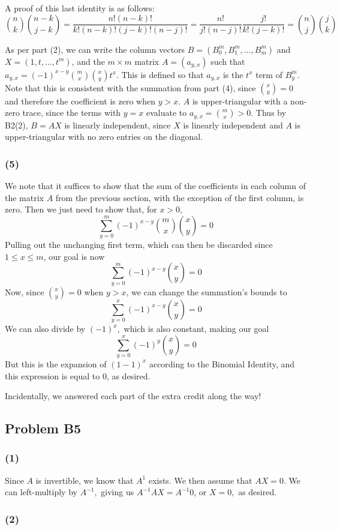 \documentclass{article}
\begin{document}
A proof of this last identity is as follows:
\[\binom{n}{k}\binom{n-k}{j-k} = \frac{n!(n-k)!}{k!(n-k)!(j-k)!(n-j)!}
=\frac{n!}{j!(n-j)!}\frac{j!}{k!(j-k)!} = \binom{n}{j}\binom{j}{k}\]

\medskip
As per part (2), we can write the column vectors
$B = \displaystyle{(B_0^m, B_1^m,\dots,B_m^m)}$ and $X = (1,t,\dots,t^m)$,
and the $m\times m$ matrix
$A = (a_{y,x})$ such that $a_{y,x} = (-1)^{x - y} \binom{m}{x}\binom{x}{y}t^x$.
This is defined so that $a_{y,x}$ is the $t^x$ term of $B^m_y$.
Note that this is consistent with the summation from part (4), since 
$\binom{x}{y} = 0$ and therefore the coefficient is zero when $y > x$. 
$A$ is upper-triangular with a non-zero trace, since the terms with $y=x$
evaluate to $a_{y,x} = \binom{m}{x} > 0$.
Thus by B2(2), $B = AX$ is linearly independent, since $X$ is linearly
independent and $A$ is upper-triangular with no zero entries on the diagonal.

\subsubsection{(5)}
We note that it suffices to show that the sum of the coefficients in each column
of the matrix $A$ from the previous section, with the exception of the first
column, is zero.
Then we just need to show that, for $x > 0,$
\[\sum_{y=0}^m (-1)^{x-y} \binom{m}{x}\binom{x}{y} = 0\]
Pulling out the unchanging first term, which can then be discarded since
$1 \leq x \leq m$, our goal is now
\[\sum_{y=0}^m (-1)^{x-y}\binom{x}{y} = 0\]
Now, since $\binom{x}{y} = 0$ when $y > x$, we can change the summation's bounds
to
\[\sum_{y=0}^x (-1)^{x-y}\binom{x}{y} = 0\]
We can also divide by $(-1)^x,$ which is also constant, making our goal
\[\sum_{y=0}^x(-1)^y \binom{x}{y} = 0\]
But this is the expansion of $(1 - 1)^x$ according to the Binomial Identity,
and this expression is equal to $0$, as desired.

\medskip
Incidentally, we answered each part of the extra credit along the way!

\subsection{Problem B5}
\subsubsection{(1)}
Since $A$ is invertible, we know that $A^{1}$ exists.
We then assume that $AX = 0.$ We can left-multiply by $A^{-1},$ giving us
$A^{-1}AX =  A^{-1}0$, or $X = 0,$ as desired.

\subsubsection{(2)}
\end{document}
